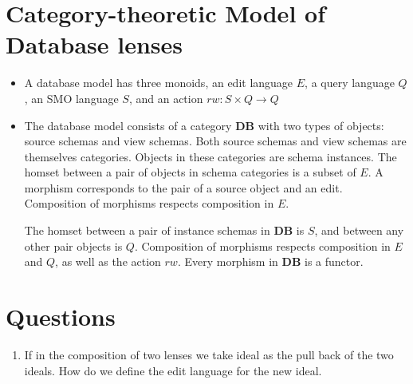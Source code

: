 \documentclass[a4paper,10pt]{article}
\newcommand{\db}{\ensuremath{\mathbf{DB}}}
\begin{document}
\section{Category-theoretic Model of Database lenses}
\begin{itemize}
 \item A database model has three monoids, an edit language $E$, a query language $Q$, an SMO language $S$, and an action $rw : S \times Q \to Q$
 \item The database model consists of a category $\db$ with two types of objects: source schemas and view schemas. Both source schemas and view schemas are themselves categories. Objects in these categories are schema instances. The homset between a pair of objects in schema categories is a subset of $E$. A morphism corresponds to the pair of a source object and an edit. Composition of morphisms respects composition in $E$.
 
 The homset between a pair of instance schemas in $\db$ is $S$, and between any other pair objects is $Q$. Composition of morphisms respects composition in $E$ and $Q$, as well as the action $rw$. Every morphism in $\db$ is a functor.
 
\end{itemize}


\section{Questions}
\begin{enumerate}
 \item If in the composition of two lenses we take ideal as the pull back of the two ideals. How do we define the edit language for the new ideal.
\end{enumerate}



\end{document}
